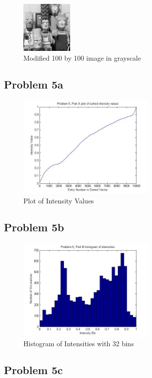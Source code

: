 \documentclass[11pt,psfig]{article}
\begin{document}
\begin{figure}[H]
\centering
\includegraphics[height=1in]{blackWhiteImage.jpg}
\caption{Modified 100 by 100 image in grayscale}
\end{figure}

\subsection*{Problem 5a}

\begin{figure}[H]
\centering
\includegraphics[height=2in]{prob5partAplot.jpg}
\caption{Plot of Intensity Values}
\end{figure}

\subsection*{Problem 5b}

\begin{figure}[H]
\centering
\includegraphics[height=2in]{prob5partBplot.jpg}
\caption{Histogram of Intensities with 32 bins}
\end{figure}

\subsection*{Problem 5c}
\end{document}
